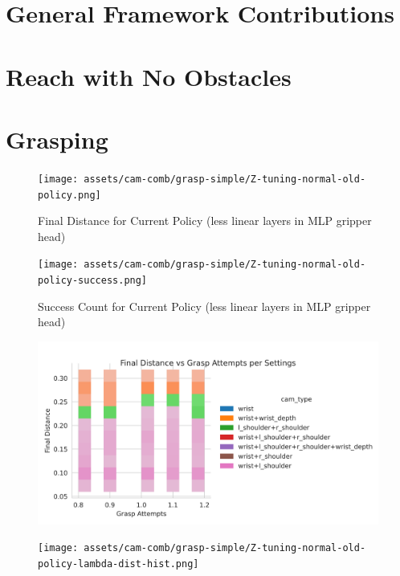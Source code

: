 \section{General Framework Contributions}


\section{Reach with No Obstacles}

\section{Grasping}

\begin{figure}[!htb] %
  \centering
  \texttt{[image: assets/cam-comb/grasp-simple/Z-tuning-normal-old-policy.png]}
  \caption{Final Distance for Current Policy (less linear layers in MLP gripper head)}\label{fig:Z}
\end{figure}

\begin{figure}[!htb] %
  \centering
  \texttt{[image: assets/cam-comb/grasp-simple/Z-tuning-normal-old-policy-success.png]}
  \caption{Success Count for Current Policy (less linear layers in MLP gripper head)}\label{fig:Z}
\end{figure}

\begin{figure}[!htb] %
  \centering
  \includegraphics[width=\linewidth]{assets/cam-comb/grasp-simple/Z-tuning-normal-old-policy-lambda-dist-hist-hue-cams.png}
  \caption{}\label{fig:Z-grasp-tuning-dist}
\end{figure}


\begin{figure}[!htb] %
  \centering
  \texttt{[image: assets/cam-comb/grasp-simple/Z-tuning-normal-old-policy-lambda-dist-hist.png]}
  \caption{}\label{fig:Z-grasp-tuning-dist}
\end{figure}

